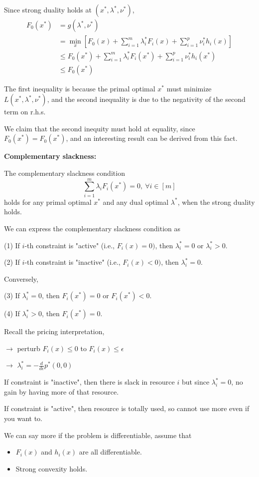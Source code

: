 Since strong duality holds at $(x^*,\lambda^*,\nu^*)$,
\begin{align*}
F_0(x^*) 
&= g(\lambda^*,\nu^*) \\
&= \min_{x}[F_0(x)+\sum^m_{i=1}\lambda_i^*F_i(x) + \sum^p_{i=1}\nu_i^*h_i(x)]\\
&\leq F_0(x^*) +\sum^m_{i=1}\lambda_i^* F_i(x^*) + \sum^p_{i=1}\nu_i^* h_i(x^*)\\
&\leq F_0(x^*)
\end{align*}


The first inequality is because the primal optimal $x^*$ must minimize $L(x^*,\lambda^*,\nu^*)$, and the second inequality is due to the negativity of the second term on r.h.s. 

We claim that the second inequity must hold at equality, since $F_0(x^*)=F_0(x^*)$, and an interesting result can be derived from this fact.


\vspace{0.3cm}
\textbf{Complementary slackness:}

The complementary slackness condition
$$\sum^m_{i=1}\lambda_iF_i(x^*)=0,\ \forall i\in [m]$$
holds for any primal optimal $x^*$ and any dual optimal $\lambda^*$, when the strong duality holds.

We can express the complementary slackness condition as

	(1) If $i$-th constraint is "active" (i.e., $F_i(x)=0)$, then $\lambda_i^*=0$ or $\lambda_i^*>0$.
	
	(2) If $i$-th constraint is "inactive" (i.e., $F_i(x)<0)$, then $\lambda_i^*=0$.

Conversely,

	(3) If $\lambda_i^*=0$, then $F_i(x^*)=0$ or $F_i(x^*)<0$.
	
	(4) If $\lambda_i^*>0$, then $F_i(x^*)=0$.

\vspace{0.5cm}
Recall the pricing interpretation,

$\rightarrow$ perturb $F_i(x)\leq 0$ to $F_i(x)\leq \epsilon$

$\rightarrow$ $\lambda_i^* = - \frac{d}{d\epsilon}p^*(0,0)$


If constraint is "inactive", then there is slack in resource $i$ but since $\lambda_i^* = 0$, no gain by having more of that resource.

If constraint is "active", then resource is totally used, so cannot use more even if you want to.


\vspace{0.5cm}
We can say more if the problem is differentiable, assume that
\begin{itemize}
	\item $F_i(x)$ and $h_i(x)$ are all differentiable.
	
	\item Strong convexity holds.
\end{itemize}

